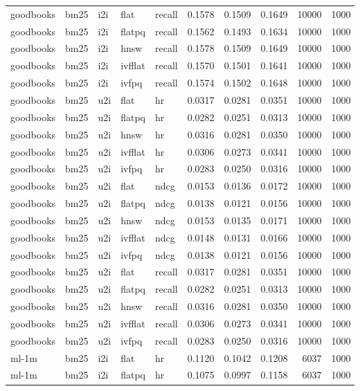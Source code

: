 \begin{tabular}{lllllrrrrr}
goodbooks & bm25 & i2i & flat & recall & 0.1578 & 0.1509 & 0.1649 & 10000 & 1000 \\
goodbooks & bm25 & i2i & flatpq & recall & 0.1562 & 0.1493 & 0.1634 & 10000 & 1000 \\
goodbooks & bm25 & i2i & hnsw & recall & 0.1578 & 0.1509 & 0.1649 & 10000 & 1000 \\
goodbooks & bm25 & i2i & ivfflat & recall & 0.1570 & 0.1501 & 0.1641 & 10000 & 1000 \\
goodbooks & bm25 & i2i & ivfpq & recall & 0.1574 & 0.1502 & 0.1648 & 10000 & 1000 \\
goodbooks & bm25 & u2i & flat & hr & 0.0317 & 0.0281 & 0.0351 & 10000 & 1000 \\
goodbooks & bm25 & u2i & flatpq & hr & 0.0282 & 0.0251 & 0.0313 & 10000 & 1000 \\
goodbooks & bm25 & u2i & hnsw & hr & 0.0316 & 0.0281 & 0.0350 & 10000 & 1000 \\
goodbooks & bm25 & u2i & ivfflat & hr & 0.0306 & 0.0273 & 0.0341 & 10000 & 1000 \\
goodbooks & bm25 & u2i & ivfpq & hr & 0.0283 & 0.0250 & 0.0316 & 10000 & 1000 \\
goodbooks & bm25 & u2i & flat & ndcg & 0.0153 & 0.0136 & 0.0172 & 10000 & 1000 \\
goodbooks & bm25 & u2i & flatpq & ndcg & 0.0138 & 0.0121 & 0.0156 & 10000 & 1000 \\
goodbooks & bm25 & u2i & hnsw & ndcg & 0.0153 & 0.0135 & 0.0171 & 10000 & 1000 \\
goodbooks & bm25 & u2i & ivfflat & ndcg & 0.0148 & 0.0131 & 0.0166 & 10000 & 1000 \\
goodbooks & bm25 & u2i & ivfpq & ndcg & 0.0138 & 0.0121 & 0.0156 & 10000 & 1000 \\
goodbooks & bm25 & u2i & flat & recall & 0.0317 & 0.0281 & 0.0351 & 10000 & 1000 \\
goodbooks & bm25 & u2i & flatpq & recall & 0.0282 & 0.0251 & 0.0313 & 10000 & 1000 \\
goodbooks & bm25 & u2i & hnsw & recall & 0.0316 & 0.0281 & 0.0350 & 10000 & 1000 \\
goodbooks & bm25 & u2i & ivfflat & recall & 0.0306 & 0.0273 & 0.0341 & 10000 & 1000 \\
goodbooks & bm25 & u2i & ivfpq & recall & 0.0283 & 0.0250 & 0.0316 & 10000 & 1000 \\
ml-1m & bm25 & i2i & flat & hr & 0.1120 & 0.1042 & 0.1208 & 6037 & 1000 \\
ml-1m & bm25 & i2i & flatpq & hr & 0.1075 & 0.0997 & 0.1158 & 6037 & 1000 \\

\end{tabular}
